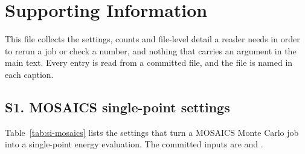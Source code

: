 \section*{Supporting Information}
\setcounter{table}{0}
\renewcommand{\thetable}{S\arabic{table}}

This file collects the settings, counts and file-level detail a reader
needs in order to rerun a job or check a number, and nothing that carries an
argument in the main text. Every entry is read from a committed file, and the
file is named in each caption.

\subsection*{S1. MOSAICS single-point settings}

Table~\ref{tab:si-mosaics} lists the settings that turn a MOSAICS Monte
Carlo job into a single-point energy evaluation. The committed inputs are
 and
.

